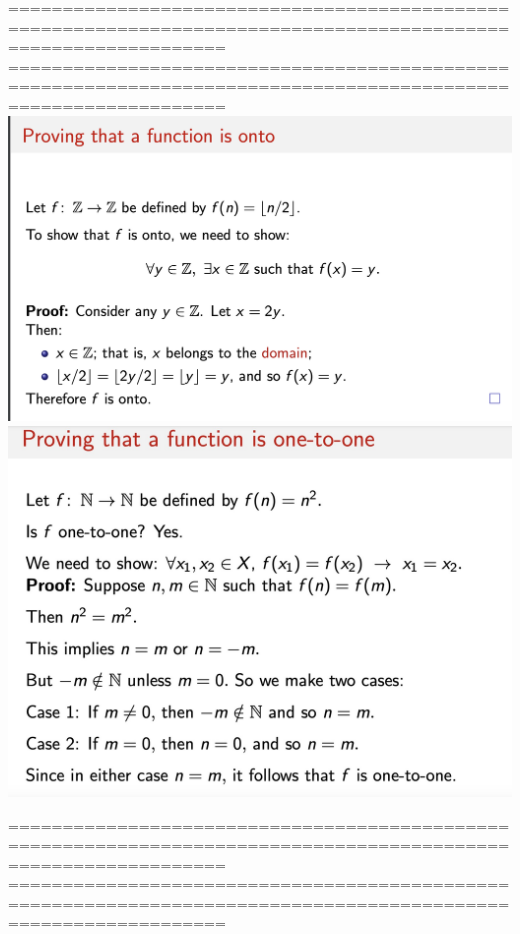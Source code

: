 \documentclass{article}
\begin{document}
\begin{itemize}
\begin{itemize}
================================================================================================================
\newpage
================================================================================================================
 \includegraphics[width=1.0\linewidth]{graph/3.jpg} %
  \includegraphics[width=1.0\linewidth]{graph/4.jpg} %
\end{itemize}
 
 ================================================================================================================
\newpage
================================================================================================================


\end{itemize}
\end{document}
